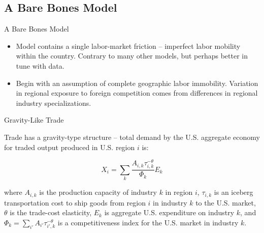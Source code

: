\documentclass[aspectratio=169]{beamer}
\begin{document}

\subsection{A Bare Bones Model}


\begin{frame}{A Bare Bones Model}

\begin{itemize}
    \item<1-> Model contains a single labor-market friction – imperfect labor mobility within the country.  Contrary to many other models, but perhaps better in tune with data.
    \item<2-> Begin with an assumption of complete geographic labor immobility.  Variation in regional exposure to foreign competition comes from differences in regional industry specializations.
\end{itemize}
    
\end{frame}


\begin{frame}{Gravity-Like Trade}

Trade has a gravity-type structure – total demand by the U.S. aggregate economy for traded output produced in U.S. region $ i $ is:

\begin{equation}
    X_{i} = \sum_{k}\frac{A_{i,k} \tau_{i,k}^{-\theta}}{\Phi_k} E_{k}
    \label{eq:Xi}
\end{equation}

where $ A_{i,k} $ is the production capacity of industry $ k $ in region $ i $, $ \tau_{i,k} $ is an iceberg transportation cost to ship goods from region $ i $ in industry $ k $ to the U.S. market, $ \theta $ is the trade-cost elasticity, $ E_{k} $ is aggregate U.S. expenditure on industry $ k $, and $ \Phi_k = \sum_{i'} A_{i'} \tau_{i',k}^{-\theta} $ is a competitiveness index for the U.S. market in industry $ k $.
    
\end{frame}

\end{document}
